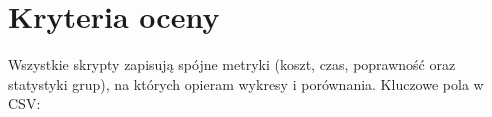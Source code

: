 
\section{Kryteria oceny}

Wszystkie skrypty zapisują spójne metryki (koszt, czas, poprawność oraz statystyki grup), na których opieram wykresy i porównania. Kluczowe pola w CSV:

